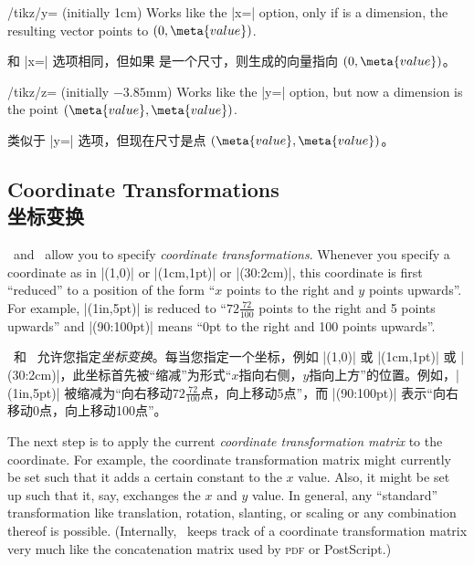 \begin{key}{/tikz/y= (initially 1cm)}
    Works like the |x=| option, only if  is a dimension, the
    resulting vector points to $(0,\meta{value})$.

    和 |x=| 选项相同，但如果  是一个尺寸，则生成的向量指向 $(0,\meta{value})$。

\end{key}

\begin{key}{/tikz/z= (initially \normalfont$-3.85$mm)}
    Works like the |y=| option, but now a dimension is the point
    $(\meta{value},\meta{value})$.
    
    类似于 |y=| 选项，但现在尺寸是点 $(\meta{value},\meta{value})$。

\begin{codeexample}[]
\end{codeexample}
\end{key}


\subsection{Coordinate Transformations\\坐标变换}

\pgfname\ and \tikzname\ allow you to specify \emph{coordinate
transformations}. Whenever you specify a coordinate as in |(1,0)| or
|(1cm,1pt)| or |(30:2cm)|, this coordinate is first ``reduced'' to a position
of the form ``$x$ points to the right and $y$ points upwards''. For example,
|(1in,5pt)| is reduced to ``$72\frac{72}{100}$ points to the right and 5 points
upwards'' and |(90:100pt)| means ``0pt to the right and 100 points upwards''.

\pgfname\ 和 \tikzname\ 允许您指定\emph{坐标变换}。每当您指定一个坐标，例如 |(1,0)| 或 |(1cm,1pt)| 或 |(30:2cm)|，此坐标首先被“缩减”为形式“$x$指向右侧，$y$指向上方”的位置。例如，|(1in,5pt)| 被缩减为“向右移动$72\frac{72}{100}$点，向上移动5点”，而 |(90:100pt)| 表示“向右移动0点，向上移动100点”。

The next step is to apply the current \emph{coordinate transformation matrix}
to the coordinate. For example, the coordinate transformation matrix might
currently be set such that it adds a certain constant to the $x$ value. Also,
it might be set up such that it, say, exchanges the $x$ and $y$ value. In
general, any ``standard'' transformation like translation, rotation, slanting,
or scaling or any combination thereof is possible. (Internally, \pgfname\ keeps
track of a coordinate transformation matrix very much like the concatenation
matrix used by \textsc{pdf} or PostScript.)

